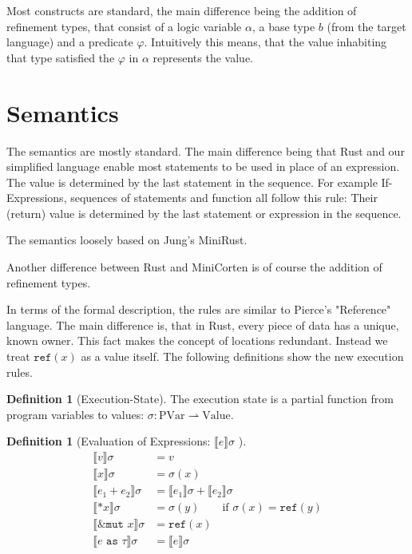 \documentclass{book}
\newcommand{\code}[1]{\texttt{#1}}
\newcommand{\bbracket}[1]{\llbracket #1 \rrbracket}
\theoremstyle{definition}
\newtheorem{definition}[theorem]{Definition}
\begin{document}
Most constructs are standard, the main difference being the addition of refinement types, that consist of a logic variable $\alpha$, a base type $b$ (from the target language) and a predicate $\varphi$. Intuitively this means, that the value inhabiting that type satisfied the $\varphi$ in $\alpha$ represents the value. 

\section{Semantics}

The semantics are mostly standard. The main difference being that Rust and our simplified language enable most statements to be used in place of an expression. The value is determined by the last statement in the sequence. For example If-Expressions, sequences of statements and function all follow this rule: Their (return) value is determined by the last statement or expression in the sequence.

The semantics loosely based on Jung's MiniRust.

Another difference between Rust and MiniCorten is of course the addition of refinement types.

In terms of the formal description, the rules are similar to Pierce's \cite[p. 166f]{pierce_types_2002-3} "Reference" language. %
The main difference is, that in Rust, every piece of data has a unique, known owner. This fact makes the concept of locations redundant. Instead we treat $\code{ref}(x)$ as a value itself. The following definitions show the new execution rules.

\begin{definition}[Execution-State]
  The execution state is a partial function from program variables to values: $\sigma : \text{PVar} \rightharpoonup \text{Value}$. 
\end{definition}


\begin{definition}[Evaluation of Expressions: $\bbracket{e} \sigma$ ]
  \begin{align*}
   \bbracket{v} \sigma &= v \\
   \bbracket{x} \sigma &= \sigma(x) \\
   \bbracket{e_1 + e_2} \sigma &= \bbracket{e_1} \sigma + \bbracket{e_2} \sigma \\
   \bbracket{*x} \sigma &= \sigma(y) \qquad \text{if } \sigma(x) = \code{ref}(y) \\
   \bbracket{\code{\&mut } x} \sigma &= \code{ref}(x) \\
   \bbracket{e \code{ as } \tau} \sigma &= \bbracket{e}\sigma \\
  \end{align*}
 \end{definition}
 
\end{document}
